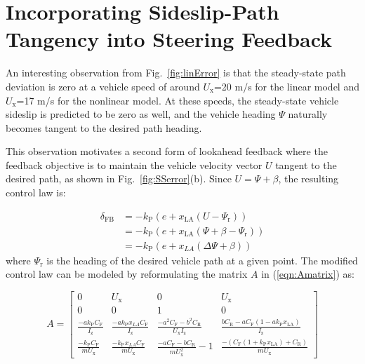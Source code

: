 \documentclass{nVSD2e}
\theoremstyle{plain}
\theoremstyle{definition}
\theoremstyle{remark}
\begin{document}

\section{Incorporating Sideslip-Path Tangency into Steering Feedback}
\label{sec:betafb}

An interesting observation from Fig.~\ref{fig:linError} is that the steady-state path deviation
 is zero at a vehicle speed of around $U_\mathrm{x}$=20 m/s for the linear model and $U_\mathrm{x}$=17 m/s for the nonlinear model. 
 At these speeds, the steady-state vehicle sideslip is predicted to be zero as well, 
and the vehicle heading $\Psi$ naturally becomes tangent to the desired path heading. 

This observation motivates a second form of lookahead feedback where the feedback objective is to maintain the 
vehicle velocity vector $U$ tangent to the desired path, as shown in Fig.~\ref{fig:SSerror}(b). Since
 $U=\Psi+\beta$, the resulting control law is:
 
 
\begin{subequations}
\label{eqn:vveq}
\begin{align}
        \delta_\mathrm{FB} & = -k_\mathrm{P} (e+x_\mathrm{LA} (U-\Psi_\mathrm{r} ) ) \\
                           & =  -k_\mathrm{P} (e+x_\mathrm{LA} (\Psi+\beta-\Psi_\mathrm{r} )) \\
						   & = -k_\mathrm{P}(e+x_{LA}(\Delta\Psi+\beta))
\end{align}
\end{subequations}
 where $\Psi_\mathrm{r}$ is the heading of the desired vehicle path at a given point. The modified control law can be modeled by reformulating the matrix $A$ in (\ref{eqn:Amatrix}) as:
 
\begin{equation}
\label{eqn:Amatrix2}
A  = 
 \begin{bmatrix}
  0 & U_\mathrm{x} & 0 & U_\mathrm{x} \\
  0 & 0 & 1 & 0 \\
  \frac{-ak_\mathrm{P} C_\mathrm{F}}{I_\mathrm{z}}  & \frac{-ak_\mathrm{P}x_{LA}C_\mathrm{F}}{I_\mathrm{z}}  & \frac{-a^2C_\mathrm{F}-b^2C_\mathrm{R}}{U_\mathrm{x}I_\mathrm{z}} & \frac{bC_\mathrm{R} - aC_\mathrm{F}(1-ak_\mathrm{P}x_\mathrm{LA}) }{I_\mathrm{z}}  \\
  \frac{-k_\mathrm{P}C_\mathrm{F}}{mU_\mathrm{x}}  & \frac{-k_\mathrm{P}x_{LA}C_\mathrm{F}}{mU_\mathrm{x}}  & \frac{-aC_\mathrm{F}-bC_\mathrm{R}}{mU_\mathrm{x}^2}-1 & \frac{-(C_\mathrm{F}(1+k_\mathrm{P}x_\mathrm{LA}) + C_\mathrm{R})}{mU_\mathrm{x}}
 \end{bmatrix}
 \end{equation}
 
\end{document}
